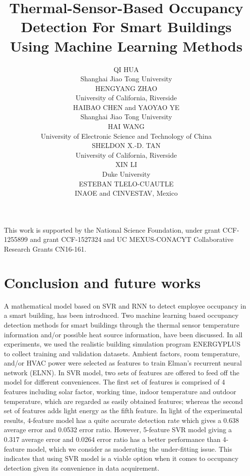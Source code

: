 \documentclass[acmtodaes]{acmtrans2m}
\title{Thermal-Sensor-Based Occupancy Detection For Smart Buildings Using Machine Learning Methods}
\author{ \small
QI HUA \\
Shanghai Jiao Tong University\\
HENGYANG ZHAO\\
University of California, Riverside\\
HAIBAO CHEN and YAOYAO YE\\
Shanghai Jiao Tong University\\
HAI WANG \\
University of Electronic Science and Technology of China\\
SHELDON X.-D. TAN \\
University of California, Riverside\\
XIN LI\\
Duke University\\
ESTEBAN TLELO-CUAUTLE \\
INAOE and CINVESTAV, Mexico
}
\let\orgsetcounter\setcounter
\begin{document}
{\let\setcounter\orgsetcounter
\begin{bottomstuff}
\newline \indent 
This work is supported by the National Science Foundation, under
  grant CCF-1255899 and grant CCF-1527324 and UC MEXUS-CONACYT
  Collaborative Research Grants CN16-161.

\end{bottomstuff}
}

\maketitle











%
%
%
%

\section{Conclusion and future works}
\label{sec:conclution}
A mathematical model based on SVR and RNN to detect
employee occupancy in a smart building, has been introduced. Two
machine learning based occupancy detection methods for smart buildings
through the thermal sensor temperature information and/or possible
heat source information, have been discussed. In all experiments, we
used the realistic building simulation program ENERGYPLUS to collect
training and validation datasets. Ambient factors, room temperature,
and/or HVAC power were selected as features to train Elman's recurrent
neural network (ELNN). In SVR model, two sets of features are offered
to feed off the model for different conveniences. The first set of
features is comprised of 4 features including solar factor, working
time, indoor temperature and outdoor temperature, which are regarded
as easily obtained features; whereas the second set of features adds
light energy as the fifth feature. In light of the experimental
results, 4-feature model has a quite accurate detection rate which
gives a 0.638 average error and 0.0532 error ratio. However, 5-feature
SVR model giving a 0.317 average error and 0.0264 error ratio has a
better performance than 4-feature model, which we consider as
moderating the under-fitting issue. This indicates that using SVR
model is a viable option when it comes to occupancy detection given
its convenience in data acquirement.
\end{document}
